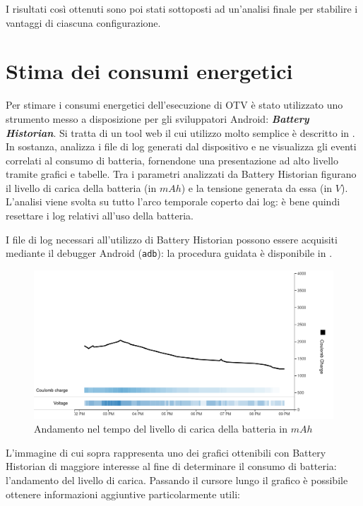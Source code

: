 \vspace{1em}

I risultati così ottenuti sono poi stati sottoposti ad un'analisi finale per stabilire i vantaggi di ciascuna configurazione. 

\section{Stima dei consumi energetici}

Per stimare i consumi energetici dell'esecuzione di OTV è stato utilizzato uno strumento messo a disposizione per gli 
sviluppatori Android: \textit{\textbf{Battery Historian}}. Si tratta di un tool web il cui utilizzo molto semplice è 
descritto in \cite{adev_battery}. In sostanza, analizza i file di log generati dal dispositivo e ne visualizza gli eventi
correlati al consumo di batteria, fornendone una presentazione ad alto livello tramite grafici e tabelle.
Tra i parametri analizzati da Battery Historian figurano il livello di carica della batteria (in $mAh$) e la tensione generata
da essa (in $V$). L'analisi viene svolta su tutto l'arco temporale coperto dai log: è bene quindi resettare i log relativi
all'uso della batteria.

I file di log necessari all'utilizzo di Battery Historian possono essere acquisiti mediante il debugger Android (\texttt{adb}): 
la procedura guidata è disponibile in \cite{adev_batlog}.

\begin{figure}[h!]
    \begin{center}
        \includegraphics[scale=0.38]{img/battery_historian_coulomb.png}
        \caption{Andamento nel tempo del livello di carica della batteria in $mAh$}
    \end{center}
\end{figure}

L'immagine di cui sopra rappresenta uno dei grafici ottenibili con Battery Historian di maggiore interesse al fine di
determinare il consumo di batteria: l'andamento del livello di carica. Passando il cursore lungo il grafico è possibile
ottenere informazioni aggiuntive particolarmente utili:

